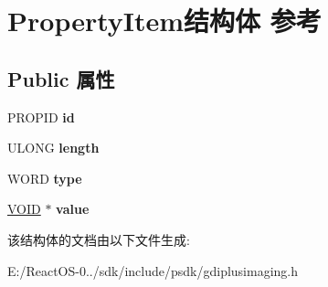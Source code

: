 \hypertarget{struct_property_item}{}\section{Property\+Item结构体 参考}
\label{struct_property_item}
\subsection*{Public 属性}
\begin{DoxyCompactItemize}
\item 
\mbox{\label{struct_property_item_aa10cd3a5be071b9c9231c146f13c316b}} 
P\+R\+O\+P\+ID {\bfseries id}
\item 
\mbox{\label{struct_property_item_a02358cdf45e8984f5423fbed71c36519}} 
U\+L\+O\+NG {\bfseries length}
\item 
\mbox{\label{struct_property_item_ae252395b4ccdd61bda2ec4c9669a28e4}} 
W\+O\+RD {\bfseries type}
\item 
\mbox{\label{struct_property_item_a9b8a07d49db1f85d0a9c25efad4d3e79}} 
\hyperlink{interfacevoid}{V\+O\+ID} $\ast$ {\bfseries value}
\end{DoxyCompactItemize}


该结构体的文档由以下文件生成\+:\begin{DoxyCompactItemize}
\item 
E\+:/\+React\+O\+S-\/0../sdk/include/psdk/gdiplusimaging.\+h\end{DoxyCompactItemize}
